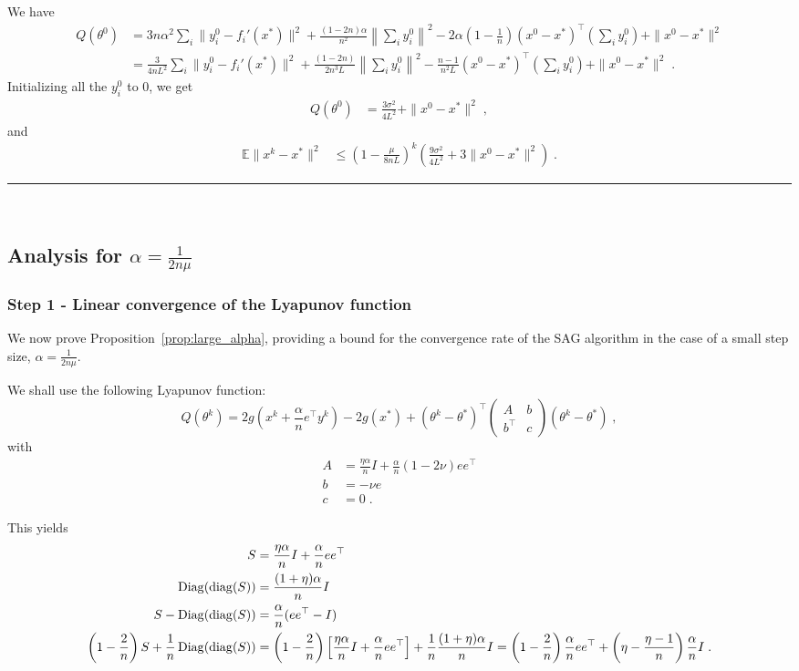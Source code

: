 \documentclass{article}
\newcommand{\diag}{\mathop{\rm diag}}
\newcommand{\Diag}{\mathop{\rm Diag}}
\newcommand{\idm}{I}
\newcommand{\BlackBox}{\rule{1.5ex}{1.5ex}}  %
\newenvironment{proof}{\par\noindent{\bf Proof\ }}{\hfill\BlackBox\\[2mm]}
\def\diag{\operatorname{diag}}
\def\E{_{\scriptscriptstyle E}}
\def \E{{\mathbb E}}
\def \E{{\mathbb E}}
\begin{document}
\begin{proof}
We have
\begin{align*}
Q(\theta^0) &= 3n\alpha^2 \sum_i \|y_i^0 - f_i'(x^\ast)\|^2 + \frac{(1 - 2n)\alpha}{n^2} \left\|\sum_i y_i^0\right\|^2 - 2\alpha\left(1 - \frac{1}{n}\right)(x^0 - x^\ast)^\top\left(\sum_i y_i^0\right) + \|x^0 - x^\ast\|^2\\
&= \frac{3}{4nL^2}\sum_i \|y_i^0 - f_i'(x^\ast)\|^2 + \frac{(1 - 2n)}{2n^3L} \left\|\sum_i y_i^0\right\|^2 - \frac{n-1}{n^2L}(x^0 - x^\ast)^\top\left(\sum_i y_i^0\right) + \|x^0 - x^\ast\|^2 \; .
\end{align*}
Initializing all the $y_i^0$ to 0, we get
\begin{align*}
Q(\theta^0) &= \frac{3\sigma^2}{4L^2} + \|x^0 - x^\ast\|^2 \; ,
\end{align*}
and
\begin{align*}
\E \| x^k - x^\ast \|^2 & \leqslant \left(1 - \frac{\mu}{8nL}\right)^k \left(\frac{9\sigma^2}{4L^2} + 3\|x^0 - x^\ast\|^2\right) \; .
\end{align*}
\end{proof}

\subsection{Analysis for $\alpha = \frac{1}{2 n \mu}$}
\subsubsection*{Step 1 - Linear convergence of the Lyapunov function}
We now prove Proposition~\ref{prop:large_alpha}, providing a bound for the convergence rate of the SAG algorithm in the case of a small step size, $\alpha = \frac{1}{2n\mu}$.

We shall use the following Lyapunov function:
\[
Q(\theta^k) = 2 g \left(x^k + \frac{\alpha}{n} e^\top y^k\right) - 2 g(x^\ast) +
(\theta^k - \theta^\ast)^\top
\left(
\begin{array}{cc} A & b \\ b^\top & c
\end{array}
\right)
(\theta^k - \theta^\ast) \; ,
\]
with
\begin{align*}
A & = \frac{\eta \alpha}{n} \idm + \frac{\alpha}{n} (1 - 2 \nu )ee^\top \\
b & = - \nu e \\
c & = 0 \; .
\end{align*}

This yields
\begin{align*}
S & = \frac{ \eta \alpha}{n} \idm + \frac{\alpha}{n} ee^\top \\
\Diag(\diag(S)) & = \frac{ (1+\eta)\alpha}{n} \idm  \\
S - \Diag(\diag(S)) & = \frac{\alpha}{n} ( ee^\top - \idm )  \\
\left(1-\frac{2}{n}\right) S + \frac{1}{n} \Diag(\diag(S))
& = \left(1-\frac{2}{n}\right) \left[ \frac{ \eta \alpha}{n} \idm + \frac{\alpha}{n} ee^\top \right]
+ \frac{1}{n} \frac{ (1+\eta) \alpha}{n} \idm =
\left (1-\frac{2}{n}\right) \frac{\alpha}{n} ee^\top + \left(\eta - \frac{\eta - 1}{n}\right) \frac{\alpha}{n} \idm \; .
\end{align*}
\end{document}
